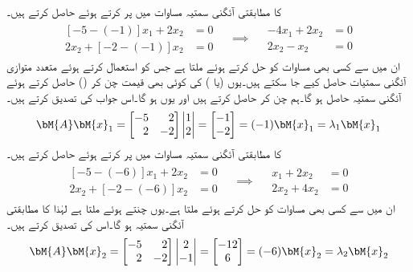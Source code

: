  کا مطابقتی آئگنی سمتیہ مساوات  میں  پر کرتے ہوئے حاصل کرتے ہیں۔
\begin{gather*}
\begin{aligned}
[-5-(-1)]x_1+2x_2&=0\\
2x_2+[-2-(-1)]x_2&=0
\end{aligned}\quad \implies \quad \begin{aligned} -4x_1+2x_2&=0\\2x_2-x_2&=0 \end{aligned}
\end{gather*}
ان میں سے کسی بھی مساوات کو حل کرتے ہوئے   ملتا ہے جس کو استعمال کرتے ہوئے متعدد متوازی آئگنی سمتیات حاصل کیے جا سکتے ہیں۔یوں  (یا ) کی کوئی بھی قیمت چن کر () حاصل کرتے ہوئے آئگنی سمتیہ حاصل ہو گا۔ہم  چن کر  حاصل کرتے ہیں اور یوں  ہو گا۔اس جواب کی تصدیق کرتے ہیں۔
\begin{align*}
\bM{A}\bM{x}_1=\begin{bmatrix*}[r] -5&2\\2&-2 \end{bmatrix*}\begin{vmatrix} 1\\2 \end{vmatrix}=\begin{bmatrix}-1\\-2  \end{bmatrix}=(-1)\bM{x}_1=\lambda_1\bM{x}_1
\end{align*}
 کا مطابقتی آئگنی سمتیہ مساوات  میں  پر کرتے ہوئے حاصل کرتے ہیں۔
\begin{gather*}
\begin{aligned}
[-5-(-6)]x_1+2x_2&=0\\
2x_2+[-2-(-6)]x_2&=0
\end{aligned}\quad \implies \quad \begin{aligned} x_1+2x_2&=0\\2x_2+4x_2&=0 \end{aligned}
\end{gather*}
ان میں سے کسی بھی مساوات کو حل کرتے ہوئے  ملتا ہے۔یوں  چنتے ہوئے   ملتا ہے لہٰذا  کا مطابقتی آئگنی سمتیہ  ہو گا۔اس کی تصدیق کرتے ہیں۔
\begin{align*}
\bM{A}\bM{x}_2=\begin{bmatrix*}[r] -5&2\\2&-2 \end{bmatrix*}\begin{vmatrix} 2\\-1 \end{vmatrix}=\begin{bmatrix}-12\\6  \end{bmatrix}=(-6)\bM{x}_2=\lambda_2\bM{x}_2
\end{align*}
